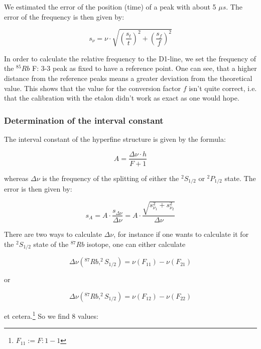 We estimated the error of the position (time) of a peak with about 5 $\mu s$. The error of the frequency is then given by:

$$s_\nu = \nu\cdot\sqrt{\left(\frac{s_t}{t}\right)^2 + \left(\frac{s_f}{f}\right)^2}$$

In order to calculate the relative frequency to the D1-line, we set the frequency of the $^{85}Rb$ F: 3-3 peak as fixed to have a reference point. One can see, that a higher distance from the reference peaks means a greater deviation from the theoretical value. This shows that the value for the conversion factor $f$ isn't quite correct, i.e. that the calibration with the etalon didn't work as exact as one would hope.

\subsubsection{Determination of the interval constant}

The interval constant of the hyperfine structure is given by the formula:

$$ A = \frac{\Delta\nu\cdot h}{F+1} $$

whereas $\Delta\nu$ is the frequency of the splitting of either the $^2S_{1/2}$ or $^2P_{1/2}$ state. The error is then given by:

$$ s_A = A\cdot\frac{s_{\Delta\nu}}{\Delta\nu} = A\cdot\frac{\sqrt{s_{\nu_1}^2 + s_{\nu_2}^2}}{\Delta\nu} $$

There are two ways to calculate $\Delta\nu$, for instance if one wants to calculate it for the $^2S_{1/2}$ state of the $^{87}Rb$ isotope, one can either calculate

$$\Delta\nu( ^{87}Rb, ^2S_{1/2}) = \nu(F_{11}) - \nu(F_{21}) $$
\begin{center} or \end{center}
$$\Delta\nu( ^{87}Rb, ^2S_{1/2}) = \nu(F_{12}) - \nu(F_{22}) $$

et cetera.\footnote{$F_{11}:= F: 1-1$} So we find 8 values:

